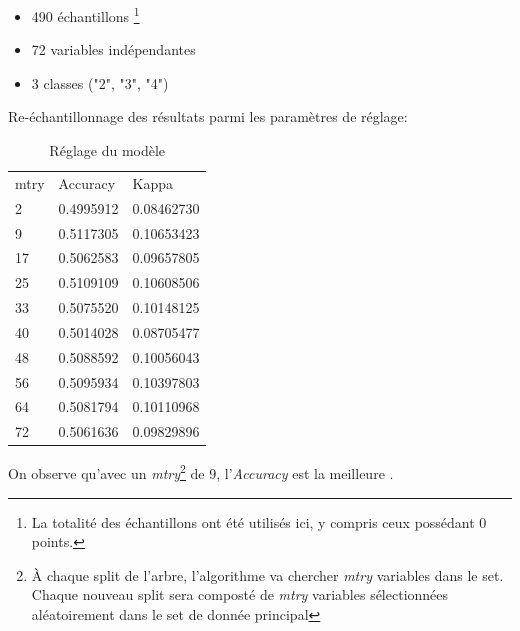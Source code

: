 \begin{itemize}
	\item 490 échantillons \footnote{La totalité des échantillons ont été utilisés ici, y compris ceux possédant 0 points.}
	\item 72 variables indépendantes
	\item 3 classes ("2", "3", "4")
\end{itemize}

Re-échantillonnage des résultats parmi les paramètres de réglage:

\begin{table}[H]
	\centering
	\caption{Réglage du modèle}
	\label{RF_Class_Resampling}
	\begin{tabular}{lll}
		mtry & Accuracy  & Kappa      \\
		2    & 0.4995912 & 0.08462730 \\
		9    & 0.5117305 & 0.10653423 \\
		17   & 0.5062583 & 0.09657805 \\
		25   & 0.5109109 & 0.10608506 \\
		33   & 0.5075520 & 0.10148125 \\
		40   & 0.5014028 & 0.08705477 \\
		48   & 0.5088592 & 0.10056043 \\
		56   & 0.5095934 & 0.10397803 \\
		64   & 0.5081794 & 0.10110968 \\
		72   & 0.5061636 & 0.09829896           
	\end{tabular}
\end{table}

\noindent On observe qu'avec un \textit{mtry}\footnote{À chaque split de l'arbre, l'algorithme va chercher \textit{mtry} variables dans le set. Chaque nouveau split sera composté de \textit{mtry} variables sélectionnées aléatoirement dans le set de donnée principal} de 9, l'\textit{Accuracy} est la meilleure .


